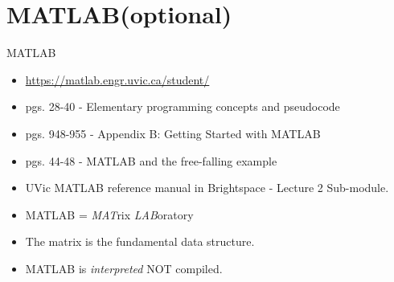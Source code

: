\documentclass[12pt]{beamer}
\begin{document}
\section{MATLAB(optional)} 

\begin{frame}{MATLAB}
\begin{itemize} 
\item{ \url{https://matlab.engr.uvic.ca/student/}}

\item{pgs. 28-40 - Elementary programming concepts and pseudocode}

\item{pgs. 948-955 - Appendix B: Getting Started with MATLAB}

\item{pgs. 44-48 - MATLAB and the free-falling example}

\item{UVic MATLAB reference manual in Brightspace - Lecture 2 Sub-module.}

\item{MATLAB = {\it MAT}rix {\it LAB}oratory}

\item{The matrix is the fundamental data structure.}

\item{MATLAB is {\it interpreted} NOT compiled.}

\end{itemize} 
\end{frame}
\end{document}
